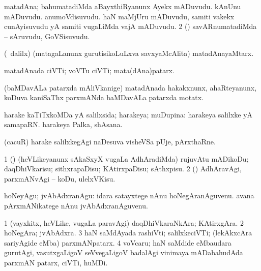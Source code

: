 {{{{{{{{{{{{{{\bentry
{} 
\gl{\nA}
\expl{}
\bmng
\bnum
{} matadAna; bahumatadiMda 
\banum
{} aBayxthiRyanunx Ayekx mADuvudu. 
 kAnUnu mADuvudu. 
 anumoVdisuvudu. 
 haN maMjUru mADuvudu, samiti \mo vakekx cunAyisuvudu yA samiti \mo vugaLiMda vajA mADuvudu. 
\eanum
\numie
\num{2} (\AmA) savARnumatadiMda -- sAruvudu, GoVSisuvudu. 
\enum
\emng
\eentry

\bentry
{} 
\gl{\nA}
\expl{}
\bmng
 (\kanmu\ \ame dalilx) (matagaLanunx gurutisikoLuLxva savxyaMcAlita) matadAnayaMtarx. 
\emng
\eentry

\bentry
{} 
\gl{\nA}
\expl{}
\bmng
 matadAnada ciVTi; voVTu ciVTi; mata(dAna)patarx. 
\emng
\eentry

\bentry 
{}
\gl{\nA}
\expl{}
\bmng
 (baMDavALa patarxda mAliVkanige) matadAnada hakakxnunx, ahaRteyanunx, koDuva kaniSaThx parxmANda baMDavALa patarxda motatx. 
\emng
\eentry

\bentry 
{} 
\gl{\gu}
\bmng
 harake kaTiTxkoMDa yA salilxsida; harakeya; muDupina:  harakeya salilxke yA samapaRN.  harakeya Palka, shAsana. 
\emng
\eentry

\bentry
{}
\gl{\nA}
\expl{}
\bmng
 (cacuR) harake salilxkegAgi naDesuva visheVSa pUje, pArxthaRne. 
\emng
\eentry

\bentry 
{} 
\gl{\akirx}
\expl{}
\bmng
\bnum
\num{1} (\pArxparx) (heVLikeyanunx sAkaSxyX \mo vugaLa AdhAradiMda) rujuvAtu mADikoDu; daqDhiVkarisu; sithxrapaDisu; KAtirxpaDisu; sAthxpisu. 
\num{2} (\pArxparx) AdhAravAgi, parxmANvAgi -- koDu, ulelxVKisu. 
\enum
\emng

\noindent 
\gl{\akirx}
\expl{}
\bmng
 hoNeyAgu; jvAbAdxranAgu:  idara satayxtege nAnu hoNegAranAguvenu.  avana pArxmANikatege nAnu jvAbAdxranAguvenu. 
\emng
\eentry

\bentry 
{} 
\gl{\nA}
\expl{}
\bmng
\bnum
\num{1} (vayxkitx, heVLike, \mo vugaLa paravAgi) daqDhiVkaraNkAra; KAtirxgAra. 
\num{2} hoNegAra; jvAbAdxra. 
\num{3} haN saMdAyada rashiVti; salilxkeciVTi; (lekAkxcAra sariyAgide eMba) parxmANpatarx. 
\num{4} voVcaru; haN saMdide eMbaudara gurutAgi, vasutxgaLigoV seVvegaLigoV badalAgi vinimaya mADabahudAda parxmAN patarx, ciVTi, huMDi. 
\enum
\emng
\eentry

}}}}}}}}}}}}}}
